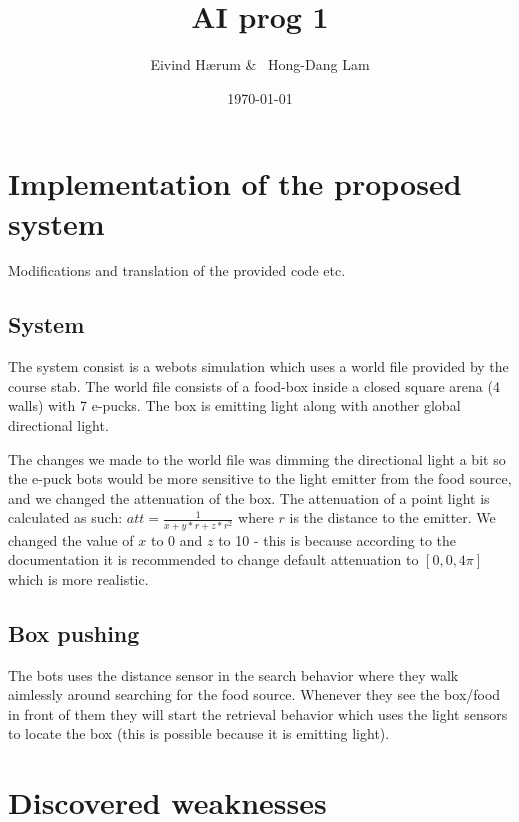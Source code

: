 \documentclass[12pt, a4paper]{article}
\title{AI prog 1}
\author{Eivind Hærum \& \ Hong-Dang Lam}
\date{\today} %
\begin{document}
\maketitle
% 
% 
 
\newpage
\tableofcontents
\newpage

\section{Implementation of the proposed system}
Modifications and translation of the provided code etc.

\subsection{System}
The system consist is a webots simulation which uses a world file provided by the course stab. The world file consists of a food-box inside a closed square arena (4 walls) with 7 e-pucks. The box is emitting light along with another global directional light.

The changes we made to the world file was dimming the directional light a bit so the e-puck bots would be more sensitive to the light emitter from the food source, and we changed the attenuation of the box. The attenuation of a point light is calculated as such: $ att = \frac{1}{x+y*r+z*r^2} $ where $r$ is the distance to the emitter. We changed the value of $x$ to 0 and $z$ to 10 - this is because according to the documentation it is recommended to change default attenuation to $[0,0,4\pi]$ which is more realistic. 
\subsection{Box pushing}
The bots uses the distance sensor in the search behavior where they walk aimlessly around searching for the food source. Whenever they see the box/food in front of them they will start the retrieval behavior which uses the light sensors to locate the box (this is possible because it is emitting light).


\section{Discovered weaknesses}
\end{document}
